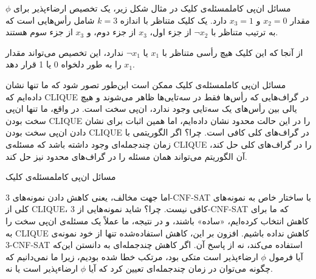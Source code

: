 \begin{itemframe-s}{مسائل ان‌پی کامل}{مسئله‌ی کلیک}
\itm
در مثال شکل زیر، یک تخصیص ارضاءپذیر برای
$\phi$
مقدار
$x_2 = 0$ و $x_3 = 1$
دارد. یک کلیک متناظر با اندازه
$k = 3$
شامل رأس‌هایی است که به ترتیب متناظر با
$\lnot x_2$
از جزء اول،
$x_3$
از جزء دوم، و
$x_3$
از جزء سوم هستند.

از آنجا که این کلیک هیچ رأسی متناظر با
$x_1$
 یا
$\lnot x_1$
ندارد، این تخصیص می‌تواند مقدار
$x_1$
را به طور دلخواه 0 یا 1 قرار دهد.
\end{itemframe-s}


\begin{itemframe-s}{مسائل ان‌پی کامل}{مسئله‌ی کلیک}
\itm
ممکن است این‌طور تصور شود که ما تنها نشان داده‌ایم که CLIQUE در گراف‌هایی که رأس‌ها فقط در سه‌تایی‌ها ظاهر می‌شوند و هیچ یالی بین رأس‌های یک سه‌تایی وجود ندارد، ان‌پی سخت است.
\itm
در واقع، ما تنها ان‌پی سخت بودن CLIQUE را در این حالت محدود نشان داده‌ایم، اما همین اثبات برای نشان دادن ان‌پی سخت بودن CLIQUE در گراف‌های کلی کافی است. چرا؟
\itm
اگر الگوریتمی با زمان چندجمله‌ای وجود داشته باشد که مسئله‌ی CLIQUE را در گراف‌های کلی حل کند، آن الگوریتم می‌تواند همان مسئله را در گراف‌های محدود نیز حل کند.
\end{itemframe-s}


\begin{itemframe-s}{مسائل ان‌پی کامل}{مسئله‌ی کلیک}

\itm
اما جهت مخالف، یعنی کاهش دادن نمونه‌های 3-CNF-SAT با ساختار خاص به نمونه‌های کلی از CLIQUE، کافی نیست. چرا؟ شاید نمونه‌هایی از 3-CNF-SAT که ما برای کاهش انتخاب کرده‌ایم، «ساده» باشند، و در نتیجه، ما عملاً یک مسئله‌ی ان‌پی سخت را به CLIQUE کاهش نداده باشیم.
\itm
افزون بر این، کاهش استفاده‌شده تنها از خود نمونه‌ی 3-CNF-SAT استفاده می‌کند، نه از پاسخ آن. اگر کاهش چندجمله‌ای به دانستن این‌که آیا فرمول $\phi$ ارضاء‌پذیر است متکی بود، مرتکب خطا شده بودیم، زیرا ما نمی‌دانیم که چگونه می‌توان در زمان چندجمله‌ای تعیین کرد که آیا $\phi$ ارضاءپذیر است یا نه.
\end{itemframe-s}